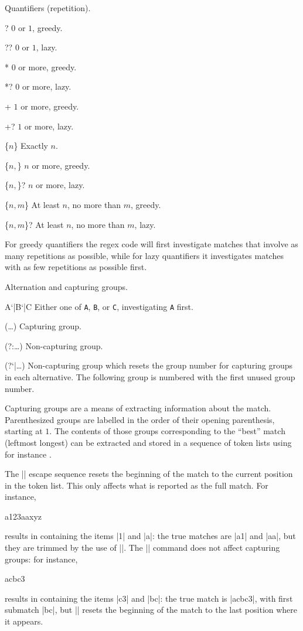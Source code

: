 \documentclass[oneside]{book}
\begin{document}
Quantifiers (repetition).
\begin{l3regex-syntax}
  \item[?] $0$ or $1$, greedy.
  \item[??] $0$ or $1$, lazy.
  \item[*] $0$ or more, greedy.
  \item[*?] $0$ or more, lazy.
  \item[+] $1$ or more, greedy.
  \item[+?] $1$ or more, lazy.
  \item[\{$n$\}] Exactly $n$.
  \item[\{$n,$\}] $n$ or more, greedy.
  \item[\{$n,$\}?] $n$ or more, lazy.
  \item[\{$n,m$\}] At least $n$, no more than $m$, greedy.
  \item[\{$n,m$\}?] At least $n$, no more than $m$, lazy.
\end{l3regex-syntax}
For greedy quantifiers the regex code will first investigate matches
that involve as many repetitions as possible, while for lazy
quantifiers it investigates matches with as few repetitions as
possible first.

Alternation and capturing groups.
\begin{l3regex-syntax}
  \item[A\char`|B\char`|C] Either one of \texttt{A}, \texttt{B},
    or \texttt{C}, investigating \texttt{A} first.
  \item[(\ldots{})] Capturing group.
  \item[(?:\ldots{})] Non-capturing group.
  \item[(?\char`|\ldots{})] Non-capturing group which resets
    the group number for capturing groups in each alternative.
    The following group is numbered with the first unused
    group number.
\end{l3regex-syntax}

Capturing groups are a means of extracting information about the
match. Parenthesized groups are labelled in the order of their
opening parenthesis, starting at $1$. The contents of those groups
corresponding to the \enquote{best} match (leftmost longest)
can be extracted and stored in a sequence of token lists using for
instance .

The |\K| escape sequence resets the beginning of the match to the
current position in the token list. This only affects what is reported
as the full match. For instance,
\begin{codehigh}
 {a123aaxyz} \lFooSeq
\end{codehigh}
results in  containing the items |{1}| and |{a}|: the
true matches are |{a1}| and |{aa}|, but they are trimmed by the use of
|\K|. The |\K| command does not affect capturing groups: for instance,
\begin{codehigh}
 {acbc3} \lFooSeq
\end{codehigh}
results in  containing the items |{c3}| and |{bc}|: the
true match is |{acbc3}|, with first submatch |{bc}|, but |\K| resets
the beginning of the match to the last position where it appears.
\end{document}
